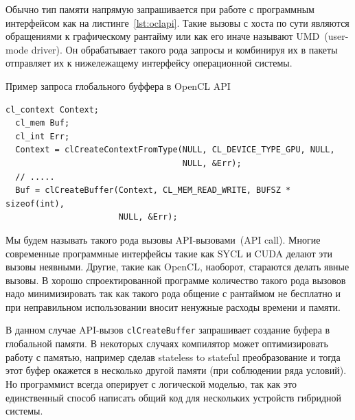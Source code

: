 Обычно тип памяти напрямую запрашивается при работе с программным интерфейсом как на листинге~\cref{lst:oclapi}. Такие вызовы с хоста по сути являются обращениями к графическому рантайму или как его иначе называют UMD~(user-mode driver). Он обрабатывает такого рода запросы и комбинируя их в пакеты отправляет их к нижележащему интерфейсу операционной системы.


\begin{ListingEnv}[!h]
    \captiondelim{ } 
    \caption{Пример запроса глобального буффера в OpenCL API}\label{lst:oclapi}
    \begin{lstlisting}[language={[ISO]C++}]
  cl_context Context;
  cl_mem Buf;
  cl_int Err;
  Context = clCreateContextFromType(NULL, CL_DEVICE_TYPE_GPU, NULL, 
                                    NULL, &Err);
  // .....
  Buf = clCreateBuffer(Context, CL_MEM_READ_WRITE, BUFSZ * sizeof(int), 
                       NULL, &Err);
    \end{lstlisting}
\end{ListingEnv}

Мы будем называть такого рода вызовы API-вызовами~(API call). Многие современные программные интерфейсы такие как SYCL и CUDA делают эти вызовы неявными. Другие, такие как OpenCL, наоборот, стараются делать явные вызовы. В хорошо спроектированной программе количество такого рода вызовов надо минимизировать так как такого рода общение с рантаймом не бесплатно и при неправильном использовании вносит ненужные расходы времени и памяти.

В данном случае API-вызов \lstinline!clCreateBuffer! запрашивает создание буфера в глобальной памяти. В некоторых случаях компилятор может оптимизировать работу с памятью, например сделав stateless to stateful преобразование и тогда этот буфер окажется в несколько другой памяти (при соблюдении ряда условий). Но программист всегда оперирует с логической моделью, так как это единственный способ написать общий код для нескольких устройств гибридной системы.

